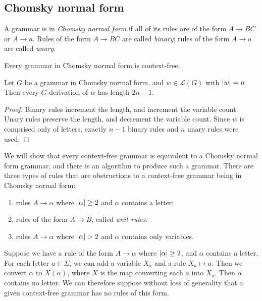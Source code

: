 \subsection{Chomsky normal form}
\begin{definition}
	A grammar is in \emph{Chomsky normal form} if all of its rules are of the form \( A \to BC \) or \( A \to a \).
	Rules of the form \( A \to BC \) are called \emph{binary}; rules of the form \( A \to a \) are called \emph{unary}.
\end{definition}
Every grammar in Chomsky normal form is context-free.
\begin{lemma}
	Let \( G \) be a grammar in Chomsky normal form, and \( w \in \mathcal L(G) \) with \( \abs{w} = n \).
	Then every \( G \)-derivation of \( w \) has length \( 2n - 1 \).
\end{lemma}
\begin{proof}
	Binary rules increment the length, and increment the variable count.
	Unary rules preserve the length, and decrement the variable count.
	Since \( w \) is comprised only of letters, exactly \( n - 1 \) binary rules and \( n \) unary rules were used.
\end{proof}
We will show that every context-free grammar is equivalent to a Chomsky normal form grammar, and there is an algorithm to produce such a grammar.
There are three types of rules that are obstructions to a context-free grammar being in Chomsky normal form:
\begin{enumerate}
	\item rules \( A \to \alpha \) where \( \abs{\alpha} \geq 2 \) and \( \alpha \) contains a letter;
	\item rules of the form \( A \to B \), called \emph{unit rules}.
	\item rules \( A \to \alpha \) where \( \abs{\alpha} > 2 \) and \( \alpha \) contains only variables.
\end{enumerate}
Suppose we have a rule of the form \( A \to \alpha \) where \( \abs{\alpha} \geq 2 \), and \( \alpha \) contains a letter.
For each letter \( a \in \Sigma \), we can add a variable \( X_a \) and a rule \( X_a \mapsto a \).
Then we convert \( \alpha \) to \( X(\alpha) \), where \( X \) is the map converting each \( a \) into \( X_a \).
Then \( \alpha \) contains no letter.
We can therefore suppose without loss of generality that a given context-free grammar has no rules of this form.

